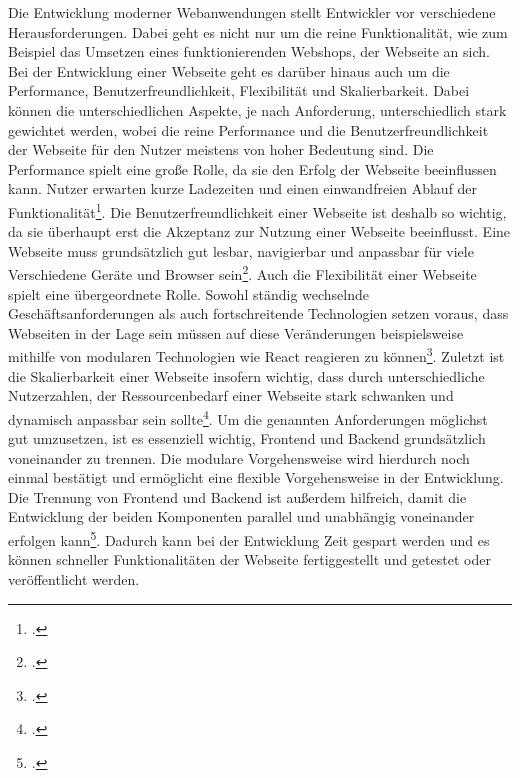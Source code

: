 Die Entwicklung moderner Webanwendungen stellt Entwickler vor verschiedene Herausforderungen. Dabei geht es nicht nur um die reine Funktionalität, wie zum Beispiel das Umsetzen eines funktionierenden Webshops, der Webseite an sich. Bei der Entwicklung einer Webseite geht es darüber hinaus auch um die Performance, Benutzerfreundlichkeit, Flexibilität und Skalierbarkeit. Dabei können die unterschiedlichen Aspekte, je nach Anforderung, unterschiedlich stark gewichtet werden, wobei die reine Performance und die Benutzerfreundlichkeit der Webseite für den Nutzer meistens von hoher Bedeutung sind.
Die Performance spielt eine große Rolle, da sie den Erfolg der Webseite beeinflussen kann. Nutzer erwarten kurze Ladezeiten und einen einwandfreien Ablauf der Funktionalität\footcite{deinhard_uberblick_2024}.
Die Benutzerfreundlichkeit einer Webseite ist deshalb so wichtig, da sie überhaupt erst die Akzeptanz zur Nutzung einer Webseite beeinflusst. Eine Webseite muss grundsätzlich gut lesbar, navigierbar und anpassbar für viele Verschiedene Geräte und Browser sein\footcite{siever_responsive_2024}.
Auch die Flexibilität einer Webseite spielt eine übergeordnete Rolle. Sowohl ständig wechselnde Geschäftsanforderungen als auch fortschreitende Technologien setzen voraus, dass Webseiten in der Lage sein müssen auf diese Veränderungen beispielsweise mithilfe von modularen Technologien wie React reagieren zu können\footcite{wiedermayer_webentwicklung_2024}.
Zuletzt ist die Skalierbarkeit einer Webseite insofern wichtig, dass durch unterschiedliche Nutzerzahlen, der Ressourcenbedarf einer Webseite stark schwanken und dynamisch anpassbar sein sollte\footcite{annacherniavska_erstellung_2023}.
Um die genannten Anforderungen möglichst gut umzusetzen, ist es essenziell wichtig, Frontend und Backend grundsätzlich voneinander zu trennen. Die modulare Vorgehensweise wird hierdurch noch einmal bestätigt und ermöglicht eine flexible Vorgehensweise in der Entwicklung. Die Trennung von Frontend und Backend ist außerdem hilfreich, damit die Entwicklung der beiden Komponenten parallel und unabhängig voneinander erfolgen kann\footcite{hort_warum_2018}. Dadurch kann bei der Entwicklung Zeit gespart werden und es können schneller Funktionalitäten der Webseite fertiggestellt und getestet oder veröffentlicht werden.